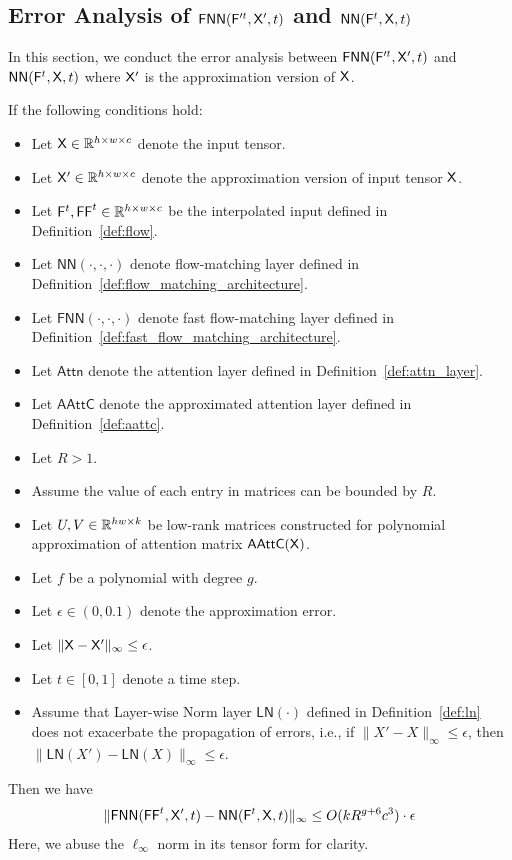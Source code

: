 \subsection{Error Analysis of \texorpdfstring{$\mathsf{FNN}(\mathsf{F}'^t,\mathsf{X}',t)$}{} and \texorpdfstring{$\mathsf{NN}(\mathsf{F}^t,\mathsf{X},t)$}{}}\label{sec:error_analysis_of_flow_matching_layer}
In this section, we conduct the error analysis between $\mathsf{FNN}(\mathsf{F}'^t,\mathsf{X}',t)$ and  $\mathsf{NN}(\mathsf{F}^t,\mathsf{X},t)$ where $\mathsf{X}'$ is the approximation version of $\mathsf{X}$.
\begin{lemma}\label{lem:error_analysis_flow_matching_layer}
If the following conditions hold:
\begin{itemize}
    \item Let $\mathsf{X} \in \mathbb{R}^{h \times w \times c}$ denote the input tensor.
    \item Let $\mathsf{X}' \in \mathbb{R}^{h \times w \times c}$ denote the approximation version of input tensor $\mathsf{X}$.
    \item Let $\mathsf{F}^t,\mathsf{FF}^t \in \mathbb{R}^{h \times w \times c}$ be the interpolated input defined in Definition~\ref{def:flow}.
    \item Let $\mathsf{NN}(\cdot,\cdot,\cdot)$ denote flow-matching layer defined in Definition~\ref{def:flow_matching_architecture}.
    \item Let $\mathsf{FNN}(\cdot,\cdot,\cdot)$ denote fast flow-matching layer defined in Definition~\ref{def:fast_flow_matching_architecture}.
     \item Let $\mathsf{Attn}$ denote the attention layer defined in Definition~\ref{def:attn_layer}.
    \item Let $\mathsf{AAttC}$ denote the approximated attention layer defined in Definition~\ref{def:aattc}.
    \item Let $R > 1$.
    \item Assume the value of each entry in matrices can be bounded by $R$. 
    \item Let $U,V \in \mathbb{R}^{hw \times k}$ be low-rank matrices constructed for polynomial approximation of attention matrix $\mathsf{AAttC}(\mathsf{X})$.
    \item Let $f$ be a polynomial with degree $g$.
    \item Let $\epsilon \in (0,0.1)$ denote the approximation error.
    \item Let $\|\mathsf{X}-\mathsf{X}'\|_\infty\leq \epsilon$.
    \item Let $t \in [0,1]$ denote a time step.
    \item Assume that Layer-wise Norm layer $\mathsf{LN}(\cdot)$ defined in Definition~\ref{def:ln} does not exacerbate the propagation of errors, i.e., if $\|X'-X\|_\infty \leq \epsilon$, then $\|\mathsf{LN}(X')-\mathsf{LN}(X)\|_\infty \leq \epsilon$.
\end{itemize}
Then we have
\begin{align*}
    \| \mathsf{FNN}(\mathsf{FF}^t,\mathsf{X}',t) - \mathsf{NN}(\mathsf{F}^t,\mathsf{X},t) \|_\infty \leq O(kR^{g+6}c^3) \cdot \epsilon
\end{align*}
Here, we abuse the $\ell_\infty$ norm in its tensor form for clarity.
\end{lemma}
